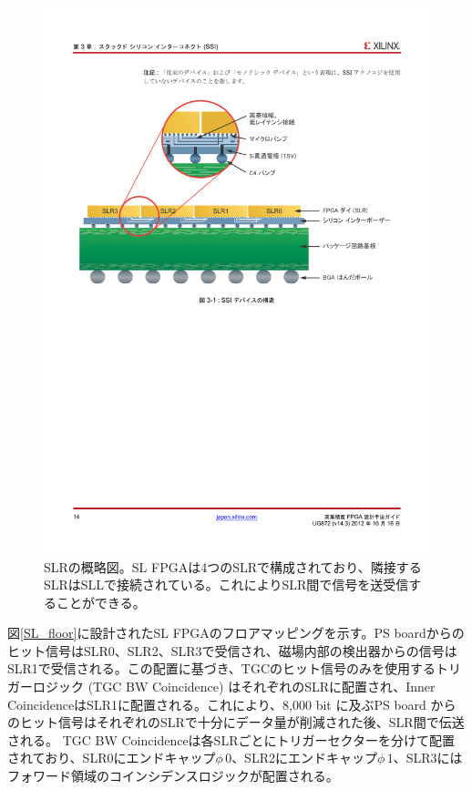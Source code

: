 \begin{figure} 
\centering
\includegraphics[width=16cm]{fig/Intro/ISEE_abstract.pdf}
\caption[SLRの概略図]{SLRの概略図。SL FPGAは4つのSLRで構成されており、隣接するSLRはSLLで接続されている。これによりSLR間で信号を送受信することができる。}
\label{ISEE_abstract}
\end{figure}

図\ref{SL_floor}に設計されたSL FPGAのフロアマッピングを示す。PS boardからのヒット信号はSLR0、SLR2、SLR3で受信され、磁場内部の検出器からの信号はSLR1で受信される。この配置に基づき、TGCのヒット信号のみを使用するトリガーロジック (TGC BW Coincidence) はそれぞれのSLRに配置され、Inner CoincidenceはSLR1に配置される。これにより、8,000 bit に及ぶPS board からのヒット信号はそれぞれのSLRで十分にデータ量が削減された後、SLR間で伝送される。
TGC BW Coincidenceは各SLRごとにトリガーセクターを分けて配置されており、SLR0にエンドキャップ$\phi\,0$、SLR2にエンドキャップ$\phi\,1$、SLR3にはフォワード領域のコインシデンスロジックが配置される。

